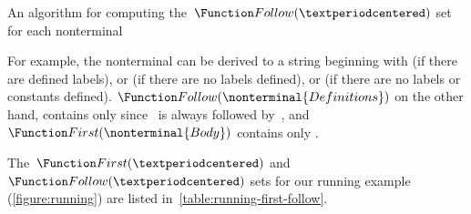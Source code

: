 \begin{algorithm}[p]
  \caption{\label{algorithm:follow}
  An algorithm for computing the~$\Function Follow(·)$ set for each nonterminal}
  \begin{algorithmic}
            \CONTINUE
          \ENDIF
          \ENDIF
        \ENDFOR
      \ENDFOR
  \end{algorithmic}
\end{algorithm}

For example, the nonterminal  can be derived to a string
  beginning with  (if there are defined labels), or 
  (if there are no labels defined), or  (if there are no
  labels or constants defined).
$\Function Follow(\nonterminal{Definitions})$ on the other hand, contains only
 since~ is always followed by~,
  and~$\Function First(\nonterminal{Body})$ contains only .

The~$\Function First(·)$ and~$\Function Follow(·)$ sets for
  our running example (\cref{figure:running}) are listed in~\cref{table:running-first-follow}.

